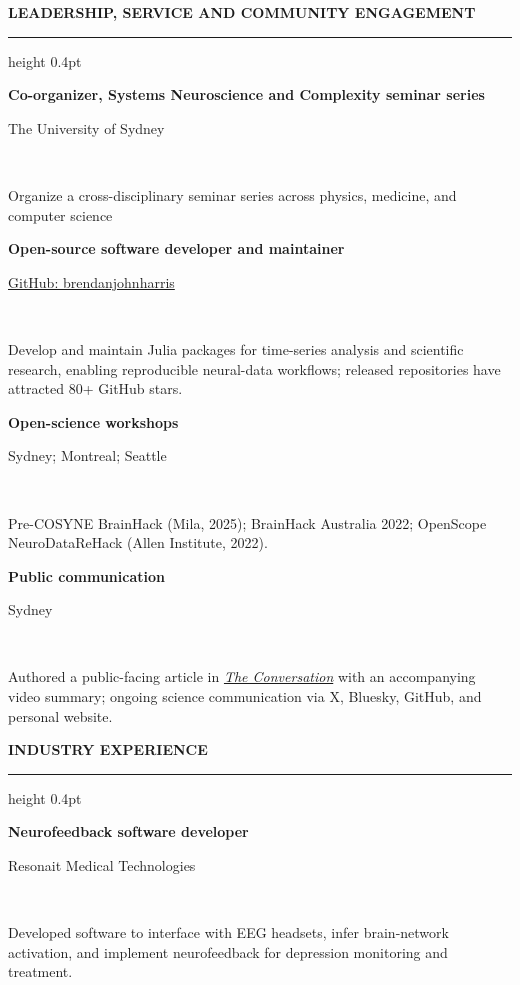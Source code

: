 \documentclass[10pt,a4paper]{article}
\renewcommand{\section}[1]{%
  \par\vspace{8pt}%
  {\small\bfseries\MakeUppercase{#1}}\par
  \vspace{4pt}\hrule height 0.4pt\vspace{2pt}}
\newcommand{\entrydesc}[4]{%
  \noindent\makebox[0.11\textwidth][l]{\footnotesize #1}%
  \begin{minipage}[t]{0.67\textwidth}\textbf{#2}\end{minipage}\hfill
  \begin{minipage}[t]{0.21\textwidth}\raggedleft\footnotesize #3\end{minipage}\\[0pt]
  \makebox[0.11\textwidth][l]{}\begin{minipage}[t]{0.67\textwidth}\small #4\end{minipage}\par\vspace{2pt}}
\begin{document}
\section{Leadership, service and community engagement}
\entrydesc{2024--}{Co-organizer, Systems Neuroscience and Complexity seminar series}{The University of Sydney}{Organize a cross-disciplinary seminar series across physics, medicine, and computer science}
\entrydesc{2018--}{Open-source software developer and maintainer}{\href{https://github.com/brendanjohnharris}{GitHub: brendanjohnharris}}{Develop and maintain Julia packages for time-series analysis and scientific research, enabling reproducible neural-data workflows; released repositories have attracted 80+ GitHub stars.}
\entrydesc{2022--}{Open-science workshops}{Sydney; Montreal; Seattle}{Pre-COSYNE BrainHack (Mila, 2025); BrainHack Australia 2022; OpenScope NeuroDataReHack (Allen Institute, 2022).}
\entrydesc{2018--}{Public communication}{Sydney}{Authored a public-facing article in \href{https://theconversation.com/crashes-blackouts-and-climate-tipping-points-how-can-we-tell-when-a-system-is-close-to-the-edge-236683}{\emph{The Conversation}} with an accompanying video summary; ongoing science communication via X, Bluesky, GitHub, and personal website.}

\vspace{2pt}


\section{Industry experience}
\entrydesc{2023}{Neurofeedback software developer}{Resonait Medical Technologies}{Developed software to interface with EEG headsets, infer brain-network activation, and implement neurofeedback for depression monitoring and treatment.}

\vspace{2pt}

\end{document}
